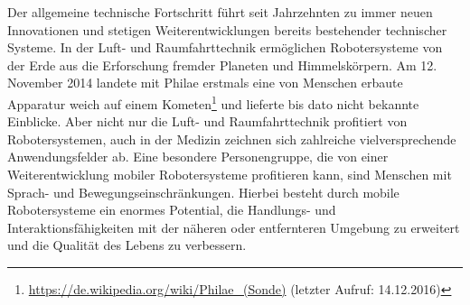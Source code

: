 Der allgemeine technische Fortschritt führt seit Jahrzehnten zu immer neuen Innovationen und stetigen Weiterentwicklungen bereits bestehender technischer Systeme. In der Luft- und Raumfahrttechnik ermöglichen Robotersysteme von der Erde aus die Erforschung fremder Planeten und Himmelskörpern. Am 12. November 2014 landete mit Philae erstmals eine von Menschen erbaute Apparatur weich auf einem Kometen\footnote{\url{https://de.wikipedia.org/wiki/Philae_(Sonde)} (letzter Aufruf: 14.12.2016)} und lieferte bis dato nicht bekannte Einblicke. Aber nicht nur die Luft- und Raumfahrttechnik profitiert von Robotersystemen, auch in der Medizin zeichnen sich zahlreiche vielversprechende Anwendungsfelder ab. Eine besondere Personengruppe, die von einer Weiterentwicklung mobiler Robotersysteme profitieren kann, sind Menschen mit Sprach- und Bewegungseinschränkungen. Hierbei besteht durch mobile Robotersysteme ein enormes Potential, die Handlungs- und Interaktionsfähigkeiten mit der näheren oder entfernteren Umgebung zu erweitert und die Qualität des Lebens zu verbessern. 

